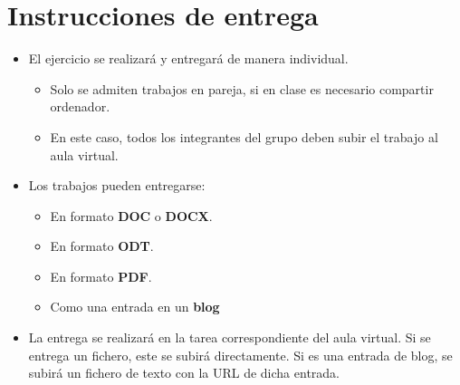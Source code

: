 \section{Instrucciones de entrega}
\begin{itemize}
\item El ejercicio se realizará y entregará de manera individual.
  \begin{itemize}
  \item Solo se admiten trabajos en pareja, si en clase es necesario compartir ordenador.
  \item En este caso, todos los integrantes del grupo deben subir el trabajo al aula virtual.

  \end{itemize}
\item Los trabajos pueden entregarse:
  \begin{itemize}
  \item En formato \textbf{DOC} o \textbf{DOCX}.
  \item En formato \textbf{ODT}.
  \item En formato \textbf{PDF}. 
  \item Como una entrada en un \textbf{blog}

  \end{itemize}
  
\item La entrega se realizará en la tarea correspondiente del aula virtual. Si se entrega un fichero, este se subirá directamente. Si es una entrada de blog, se subirá un fichero de texto con la URL de dicha entrada.
\end{itemize}  

